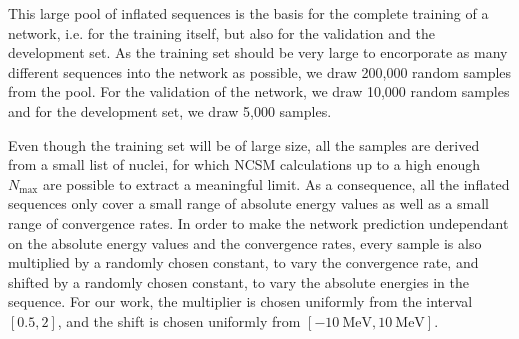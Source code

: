 This large pool of inflated sequences is the basis for the complete training of a network, i.e. for the training itself, but also for the validation and the development set. As the training set should be very large to encorporate as many different sequences into the network as possible, we draw 200,000 random samples from the pool. For the validation of the network, we draw 10,000 random samples and for the development set, we draw 5,000 samples.

Even though the training set will be of large size, all the samples are derived from a small list of nuclei, for which NCSM calculations up to a high enough $N_\mathrm{max}$ are possible to extract a meaningful limit. As a consequence, all the inflated sequences only cover a small range of absolute energy values as well as a small range of convergence rates. In order to make the network prediction undependant on the absolute energy values and the convergence rates, every sample is also multiplied by a randomly chosen constant, to vary the convergence rate, and shifted by a randomly chosen constant, to vary the absolute energies in the sequence. For our work, the multiplier is chosen uniformly from the interval $[0.5, 2]$, and the shift is chosen uniformly from $[\SI{-10}{\mega\electronvolt}, \SI{10}{\mega\electronvolt}]$.
